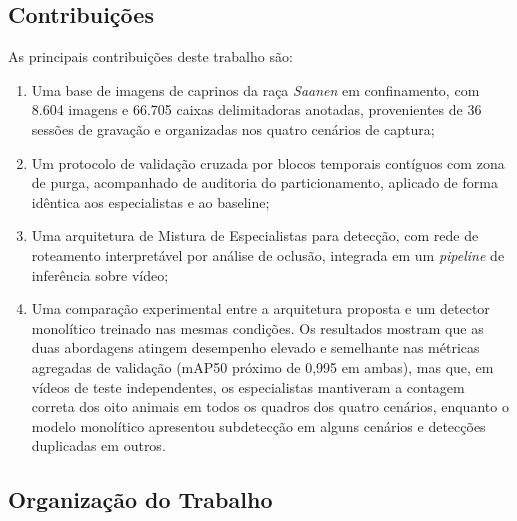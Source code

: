 \documentclass[12pt]{article}
\begin{document}
\subsection{Contribuições}
\label{subsec:contribuicoes}

As principais contribuições deste trabalho são:

\begin{enumerate}
    \item Uma base de imagens de caprinos da raça \textit{Saanen} em confinamento, com 8.604 imagens e 66.705 caixas delimitadoras anotadas, provenientes de 36 sessões de gravação e organizadas nos quatro cenários de captura;
    \item Um protocolo de validação cruzada por blocos temporais contíguos com zona de purga, acompanhado de auditoria do particionamento, aplicado de forma idêntica aos especialistas e ao baseline;
    \item Uma arquitetura de Mistura de Especialistas para detecção, com rede de roteamento interpretável por análise de oclusão, integrada em um \textit{pipeline} de inferência sobre vídeo;
    \item Uma comparação experimental entre a arquitetura proposta e um detector monolítico treinado nas mesmas condições. Os resultados mostram que as duas abordagens atingem desempenho elevado e semelhante nas métricas agregadas de validação (mAP50 próximo de 0,995 em ambas), mas que, em vídeos de teste independentes, os especialistas mantiveram a contagem correta dos oito animais em todos os quadros dos quatro cenários, enquanto o modelo monolítico apresentou subdetecção em alguns cenários e detecções duplicadas em outros.
\end{enumerate}

\subsection{Organização do Trabalho}
\label{subsec:organizacao}
\end{document}
